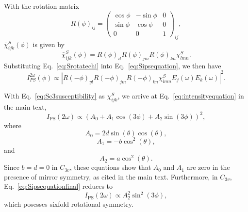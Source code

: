 With the rotation matrix
\begin{equation}
R(\phi)_{ij} = \begin{pmatrix}
\cos{\phi} & -\sin{\phi} & 0 \\
\sin{\phi} & \cos{\phi} & 0 \\
0 & 0 & 1
\end{pmatrix}_{ij},
\end{equation}
$\bar{\chi}^S_{ijk}(\phi)$ is given by
\begin{equation}
\label{eq:Srotatechi}
\bar{\chi}^S_{ijk}(\phi) = R(\phi)_{il}R(\phi)_{jm}R(\phi)_{kn}\chi^S_{lmn}.
\end{equation}
Substituting Eq.~\ref{eq:Srotatechi} into Eq.~\ref{eq:Sipsequation}, we then have
\begin{equation}
\label{eq:SintensityequationwithR}
I_{PS}^{2\omega}(\phi) \propto \left|R(-\phi)_{yl}R(-\phi)_{jm}R(-\phi)_{kn}\chi^S_{lmn}E_j(\omega)E_k(\omega)\right|^2.
\end{equation}

With Eq.~\ref{eq:Sc3susceptibility} as $\chi^S_{ijk}$, we arrive at Eq.~\ref{eq:intensityequation} in the main text,
\begin{equation}
\label{eq:Sipsequationfinal}
I_\mathrm{PS}(2\omega) \propto (A_0 + A_1\cos{(3\phi)} + A_2\sin{(3\phi)})^2,
\end{equation}
where
\begin{equation}
\label{eq:sA_0equation}
A_0 = 2d\sin(\theta)\cos(\theta),
\end{equation}
\begin{equation}
\label{eq:sA_1equation}
A_1 = -b\cos^{2}(\theta),
\end{equation}
and
\begin{equation}
\label{eq:sA_2equation}
A_2 = a\cos^{2}(\theta).
\end{equation}
Since $b = d = 0$ in $C_{3v}$, these equations show that $A_0$ and $A_1$ are zero in the presence of mirror symmetry, as cited in the main text.
Furthermore, in $C_{3v}$, Eq.~\ref{eq:Sipsequationfinal} reduces to
\begin{equation}
I_\mathrm{PS}(2\omega) \propto A_2^2\sin^{2}(3\phi),
\end{equation}
which posesses sixfold rotational symmetry.

